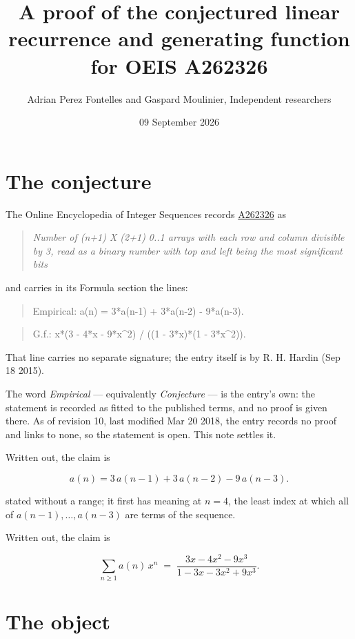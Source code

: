 \documentclass[11pt]{article}
\title{A proof of the conjectured linear recurrence and generating function for OEIS A262326}
\author{Adrian Perez Fontelles and Gaspard Moulinier, Independent researchers}
\date{09 September 2026}
\theoremstyle{definition}
\begin{document}
\maketitle
\section{The conjecture}

The Online Encyclopedia of Integer Sequences records \href{https://oeis.org/A262326}{A262326} as

\begin{quote}\itshape Number of (n+1) X (2+1) 0..1 arrays with each row and column divisible by 3, read as a binary number with top and left being the most significant bits\end{quote}

and carries in its Formula section the lines:

\begin{quote}\ttfamily Empirical: a(n) = 3*a(n-1) + 3*a(n-2) - 9*a(n-3).\end{quote}

\begin{quote}\ttfamily G.f.: x*(3 - 4*x - 9*x\textasciicircum{}2) / ((1 - 3*x)*(1 - 3*x\textasciicircum{}2)).\end{quote}

That line carries no separate signature; the entry itself is by R. H. Hardin (Sep 18 2015).

The word {\itshape Empirical} --- equivalently {\itshape Conjecture} --- is the entry's own: the statement is recorded as fitted to the published terms, and no proof is given there. As of revision 10, last modified Mar 20 2018, the entry records no proof and links to none, so the statement is open. This note settles it.

Written out, the claim is

\[a(n) = 3\,a(n-1) + 3\,a(n-2) - 9\,a(n-3).\]

stated without a range; it first has meaning at $n = 4$, the least index at which all of $a(n-1),\dots,a(n-3)$ are terms of the sequence.

Written out, the claim is

\[\sum_{n \ge 1} a(n)\,x^n \;=\; \frac{3x - 4x^{2} - 9x^{3}}{1 - 3x - 3x^{2} + 9x^{3}}.\]

\section{The object}
\end{document}
